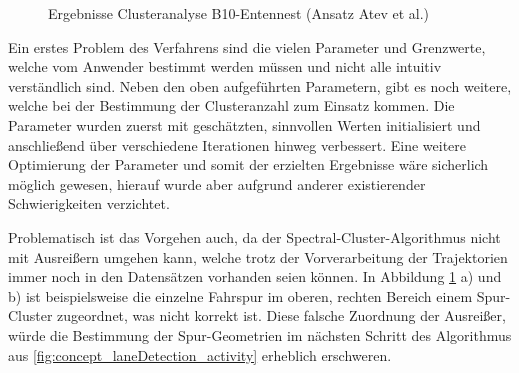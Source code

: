 \begin{figure}
    \centering
    \qquad \qquad
    \caption{Ergebnisse Clusteranalyse B10-Entennest (Ansatz Atev et al.)}
    \label{fig:real_results_atev1}
\end{figure}

Ein erstes Problem des Verfahrens sind die vielen Parameter und Grenzwerte, welche vom Anwender bestimmt werden müssen und
nicht alle intuitiv verständlich sind.
Neben den oben aufgeführten Parametern, gibt es
noch weitere, welche bei der Bestimmung der Clusteranzahl zum Einsatz kommen. Die Parameter wurden
zuerst mit geschätzten, sinnvollen Werten initialisiert und anschließend über verschiedene Iterationen hinweg verbessert.
Eine weitere Optimierung der Parameter und somit der erzielten Ergebnisse wäre sicherlich möglich gewesen,
hierauf wurde aber aufgrund anderer existierender Schwierigkeiten verzichtet.

Problematisch ist das Vorgehen auch, da der Spectral-Cluster-Algorithmus nicht mit Ausreißern umgehen kann,
welche trotz der Vorverarbeitung der Trajektorien immer noch in den Datensätzen vorhanden seien können.
In Abbildung \ref{fig:real_results_atev1} a) und b) ist beispielsweise die einzelne Fahrspur im oberen, rechten Bereich
einem Spur-Cluster zugeordnet, was nicht korrekt ist.
Diese falsche Zuordnung der Ausreißer, würde die Bestimmung der Spur-Geometrien im nächsten Schritt des
Algorithmus aus \ref{fig:concept_laneDetection_activity} erheblich erschweren.

